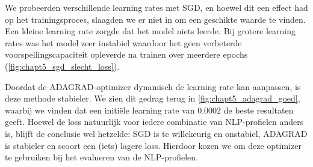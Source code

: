 We probeerden verschillende learning rates met SGD, en hoewel dit een effect had op het trainingsproces, slaagden we er niet in om een geschikte waarde te vinden. Een kleine learning rate zorgde dat het model niets leerde. Bij grotere learning rates was het model zeer instabiel waardoor het geen verbeterde voorspellingscapaciteit opleverde na trainen over meerdere epochs (\autoref{fig:chapt5_sgd_slecht_loss}).

Doordat de ADAGRAD-optimizer dynamisch de learning rate kan aanpassen, is deze methode stabieler. We zien dit gedrag terug in \autoref{fig:chapt5_adagrad_goed}, waarbij we vinden dat een initiële learning rate van $0.0002$ de beste resultaten geeft. Hoewel de loss natuurlijk voor iedere combinatie van NLP-profielen anders is, blijft de conclusie wel hetzelde: SGD is te willekeurig en onstabiel, ADAGRAD is stabieler en scoort een (iets) lagere loss. Hierdoor kozen we om deze optimizer te gebruiken bij het evalueren van de NLP-profielen.

